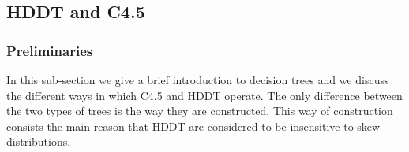 \documentclass{acm_proc_article-sp}
\begin{document}





\subsection{HDDT and C4.5}
\label{Sect.4.4}
\subsubsection{Preliminaries}
In this sub-section we give a brief introduction to decision trees and we discuss the different ways in which C4.5 and HDDT operate. The only difference between the two types of trees is the way they are constructed. This way of construction consists the main reason that HDDT are considered to be insensitive to skew distributions. 
\end{document}
